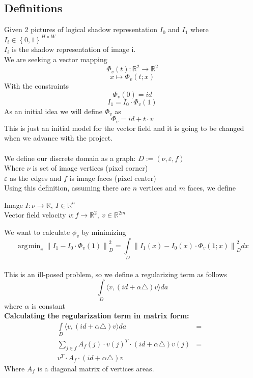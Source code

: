 \documentclass[12pt]{article}
\DeclareMathOperator*{\argmin}{\arg\!\min}
\begin{document}
\subsection{Definitions}
Given 2 pictures of logical shadow representation $I_0$ and $I_1$ where
$I_i \in \left\{ 0,1 \right\} ^ {H \times W}$ \\
$I_i$ is the shadow representation of image i. \\
We are seeking a vector mapping $$\Phi _v(t):\mathbb{R}^2\rightarrow\mathbb{R}^2$$
  $$ x\mapsto\Phi _v(t;x)$$
  With the constraints
$$\Phi _v(0) = id$$
$$I_1=I_0\cdot\Phi _v(1)$$
As an initial idea we will define $\Phi _v$ as 
$$\Phi _v = id + t \cdot v$$
This is just an initial model for the vector field and it is going to be changed when we advance with the project.
\\
\\
We define our discrete domain as a graph: $D:=(\nu,\varepsilon,f)$ \\
Where $\nu$ is set of image vertices (pixel corner) \\
$\varepsilon$ as the edges
and $f$ is image faces (pixel center)
\\
Using this definition, assuming there are $n$ vertices and $m$ faces, we define

\begin{center}
Image $I:\nu \rightarrow \mathbb{R} ,\ I \in \mathbb{R}^n $ \\
Vector field velocity $v:f \rightarrow \mathbb{R}^2 ,\ v \in \mathbb{R}^{2m} $
\end{center}

We want to calculate $\phi_v$ by minimizing 
$$ \argmin _v {\|I_1 - I_0 \cdot \Phi _v(1) \|}^2_D =
	\int \limits_D {\|I_1(x) - I_0(x) \cdot \Phi _v(1;x) \|}^2_D dx
$$
\\
This is an ill-posed problem, so we define a regularizing term as follows
$$ \displaystyle{ \int \limits_D \langle v, (id + \alpha \triangle) v \rangle da } $$
where $\alpha$ is constant
\\

\newpage
\textbf{Calculating the regularization term in matrix form:}
\begin{eqnarray}
\int \limits_D \langle v, (id + \alpha \triangle) v \rangle da &=& \\
\sum \limits_{j \in f} A_f(j) \cdot v(j)^T \cdot (id + \alpha \triangle) v(j) &=& \\
v^T \cdot A_f \cdot (id + \alpha \triangle) v
\end{eqnarray}
Where $A_f$ is a diagonal matrix of vertices areas. \\
\end{document}
